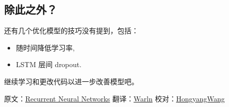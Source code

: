 \subsection{除此之外？ }\label{ux9664ux6b64ux4e4bux5916}

还有几个优化模型的技巧没有提到，包括：

\begin{itemize}
\tightlist
\item
  随时间降低学习率,
\item
  LSTM 层间 dropout.
\end{itemize}

继续学习和更改代码以进一步改善模型吧。

原文：\href{http://tensorflow.org/tutorials/recurrent/index.md}{Recurrent
Neural Networks} 翻译：\href{https://github.com/Warln}{Warln}
校对：\href{https://github.com/wanghong-yang}{HongyangWang}

